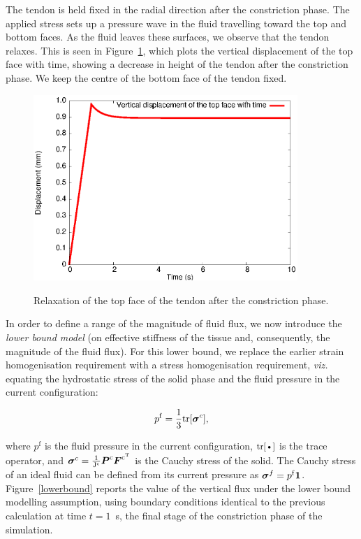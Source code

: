 The tendon is held fixed in the radial direction after the
constriction phase. The applied stress sets up a pressure wave in the
fluid travelling toward the top and bottom faces. As the fluid leaves
these surfaces, we observe that the tendon relaxes. This is seen in
Figure~\ref{topdisp}, which plots the vertical displacement of the top
face with time, showing a decrease in height of the tendon after the
constriction phase. We keep the centre of the bottom face of the
tendon fixed.

\begin{figure}[ht]
  \centering
      {\includegraphics[width=10.00cm]{images/top-vertical-displacement.eps}}
      \caption{Relaxation of the top face of the tendon after the
      constriction phase.}
      \label{topdisp}
\end{figure}

In order to define a range of the magnitude of fluid flux, we now
introduce the {\em lower bound model} (on effective stiffness of the
tissue and, consequently, the magnitude of the fluid flux). For this lower bound, we
replace the earlier strain homogenisation requirement with a stress
homogenisation requirement, {\em viz.} equating the hydrostatic stress
of the solid phase and the fluid pressure in the current
configuration:

\begin{equation}
p^{\mathrm{f}}=\frac{1}{3} \mathrm{\small{tr}}[\mbox{\boldmath$\sigma$}^{c}],
\label{equalpr}
\end{equation}

\noindent where $p^{\mathrm{f}}$ is the fluid pressure in the current
configuration, $\mbox{\small{tr}[\textbullet]}$ is the trace operator, and
$\mbox{\boldmath$\sigma$}^{c}=\frac{1}{\mathrm{J^{c}}} \mbox{\boldmath$ P$}^{\mathrm{c}}
\mbox{\boldmath$ F$}^{\mathrm{c}^{\mathrm{T}}}$ is the Cauchy stress of the solid. The
Cauchy stress of an ideal fluid can be defined from its current
pressure as \mbox{$\mbox{\boldmath$\sigma$}^{f}= p^{\mathrm{f}} {\bf 1}$.}
Figure~{\ref{lowerbound}} reports the value of the vertical flux under
the lower bound modelling assumption, using boundary conditions identical to the
previous calculation at time $t=1$~s, the final stage of the
constriction phase of the simulation. 


